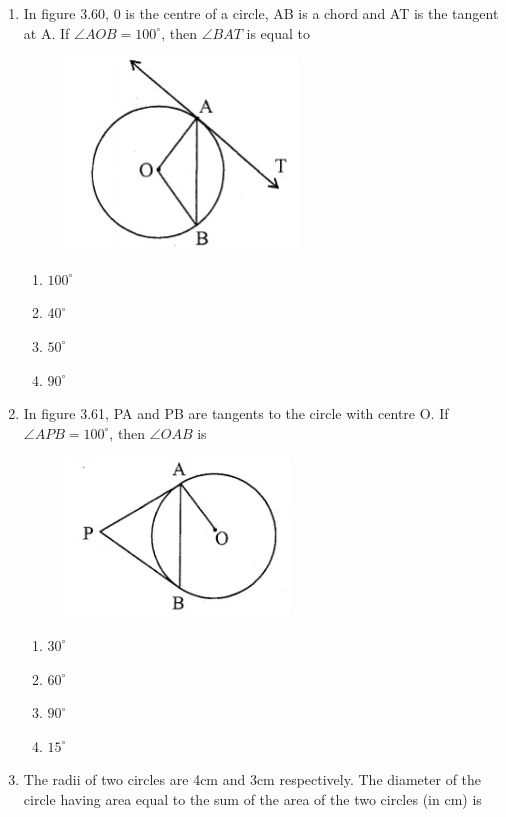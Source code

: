 
\begin{enumerate}
    \item In figure 3.60, $0$ is the centre of a circle, AB is a chord and AT is the tangent at A. If $\angle AOB = 100^\circ$, then $\angle BAT$ is equal to
    \begin{figure}[h]
        \centering
        \includegraphics{figs/circfig_1.jpg}
        \caption{}
    \end{figure}    
    \begin{enumerate}
        \item $100^\circ$
        \item $40^\circ$
        \item $50^\circ$
        \item $90^\circ$
    \end{enumerate}\newpage
    \item In figure 3.61, PA and PB are tangents to the circle with centre O. If $\angle APB=100^\circ$, then $\angle OAB$ is
    \begin{figure}[h]
        \centering
        \includegraphics{figs/circfig_2.jpg}
        \caption{}
    \end{figure}
    \begin{enumerate}
        \item $30^\circ$
        \item $60^\circ$
        \item $90^\circ$
        \item $15^\circ$
  \end{enumerate}
    \item The radii of two circles are 4cm and 3cm respectively. The diameter of the circle having area equal to the sum of the area of the two circles (in cm) is

\end{enumerate}
